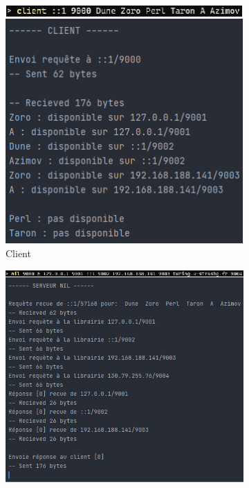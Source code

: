 \documentclass[
  french,
  twocolumn,
	9pt, %
]{fphw}
\begin{document}
\begin{figure}[h]
  \centering
  \begin{subfigure}{0.422\textwidth}
    \centering
    \includegraphics[width=\textwidth]{client.png}
    \caption{Client}
    \label{fig:client}
  \end{subfigure}
  \begin{subfigure}{.478\textwidth}
    \centering
    \includegraphics[width=\textwidth]{serveur_nil.png}

\end{subfigure}
\end{figure}
\end{document}
